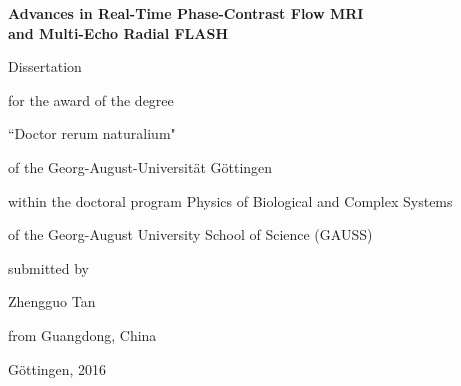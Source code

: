 \begin{titlepage}

\begin{center}

\vspace*{\fill}

{\bfseries 
  {\LARGE  
    Advances in Real-Time Phase-Contrast Flow MRI \\
    \vspace*{0.25\baselineskip}
    and Multi-Echo Radial FLASH
  } 
}

\vspace{3\baselineskip}

{\Large
  Dissertation \par 
  for the award of the degree \par 
  ``Doctor rerum naturalium" \par 
  of the Georg-August-Universit\"{a}t G\"{o}ttingen

  \vspace*{2\baselineskip}

  within the doctoral program Physics of Biological and Complex Systems \par 
  of the Georg-August University School of Science (GAUSS) 

  \vspace*{2\baselineskip}
  submitted by \par 
  \vspace*{2\baselineskip}
  
  Zhengguo Tan \par 
  from Guangdong, China

  \vspace*{\fill}
  G\"{o}ttingen, 2016
}

\end{center}

\end{titlepage}

\clearpage

